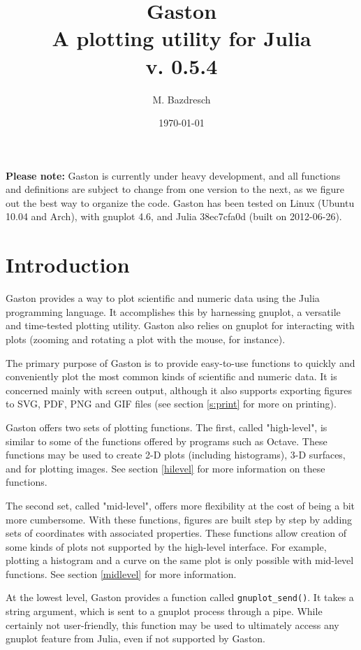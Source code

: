 \documentclass[11pt]{article}
\title{Gaston \\[0.8cm] \large A plotting utility for Julia \\[0.8cm] v. 0.5.4}
\author{M. Bazdresch}
\date{\today}
\newcommand{\cmd}[1]{\texttt{#1}}
\begin{document}
\maketitle

\textbf{Please note:} Gaston is currently under heavy development, and all
functions and definitions are subject to change from one version to the next,
as we figure out the best way to organize the code. Gaston has been tested on
Linux (Ubuntu 10.04 and Arch), with gnuplot 4.6, and Julia 38ec7cfa0d (built on
2012-06-26).

\tableofcontents

\section{Introduction}

Gaston provides a way to plot scientific and numeric data using the Julia
programming language. It accomplishes this by harnessing gnuplot, a versatile
and time-tested plotting utility. Gaston also relies on gnuplot for interacting
with plots (zooming and rotating a plot with the mouse, for instance).

The primary purpose of Gaston is to provide easy-to-use functions to quickly
and conveniently plot the most common kinds of scientific and numeric data. It
is concerned mainly with screen output, although it also supports exporting
figures to SVG, PDF, PNG and GIF files (see section \ref{s:print} for more on
printing).

Gaston offers two sets of plotting functions. The first, called "high-level",
is similar to some of the functions offered by programs such as Octave. These
functions may be used to create 2-D plots (including histograms), 3-D surfaces,
and for plotting images. See section \ref{hilevel} for more information on
these functions.

The second set, called "mid-level", offers more flexibility at the cost of
being a bit more cumbersome. With these functions, figures are built step by
step by adding sets of coordinates with associated properties. These functions
allow creation of some kinds of plots not supported by the high-level
interface. For example, plotting a histogram and a curve on the same plot is
only possible with mid-level functions. See section \ref{midlevel} for more
information.

At the lowest level, Gaston provides a function called \cmd{gnuplot\_send()}.
It takes a string argument, which is sent to a gnuplot process through a
pipe. While certainly not user-friendly, this function may be used to
ultimately access any gnuplot feature from Julia, even if not supported by
Gaston.
\end{document}
